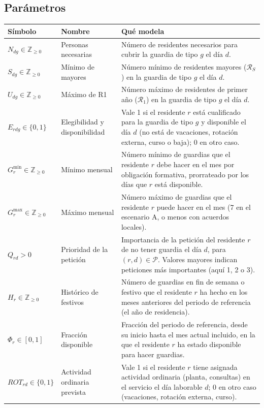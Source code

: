 \subsection{Parámetros}

{\small
\begin{longtable}{@{}p{2.6cm}p{3.0cm}p{10.0cm}@{}}
\toprule
Símbolo & Nombre & Qué modela \\
\midrule
\endhead
$N_{dg} \in \mathbb{Z}_{\ge 0}$ & Personas necesarias & Número de residentes necesarios para cubrir la guardia de tipo $g$ el día $d$. \\
$S_{dg} \in \mathbb{Z}_{\ge 0}$ & Mínimo de mayores & Número mínimo de residentes mayores ($\mathcal{R}_S$) en la guardia de tipo $g$ el día $d$. \\
$U_{dg} \in \mathbb{Z}_{\ge 0}$ & Máximo de R1 & Número máximo de residentes de primer año ($\mathcal{R}_1$) en la guardia de tipo $g$ el día $d$. \\
$E_{rdg} \in \{0, 1\}$ & Elegibilidad y disponibilidad & Vale 1 si el residente $r$ está cualificado para la guardia de tipo $g$ y disponible el día $d$ (no está de vacaciones, rotación externa, curso o baja); 0 en otro caso. \\
$G^{\min}_r \in \mathbb{Z}_{\ge 0}$ & Mínimo mensual & Número mínimo de guardias que el residente $r$ debe hacer en el mes por obligación formativa, prorrateado por los días que $r$ está disponible. \\
$G^{\max}_r \in \mathbb{Z}_{\ge 0}$ & Máximo mensual & Número máximo de guardias que el residente $r$ puede hacer en el mes (7 en el escenario A, o menos con acuerdos locales). \\
$Q_{rd} > 0$ & Prioridad de la petición & Importancia de la petición del residente $r$ de no tener guardia el día $d$, para $(r, d) \in \mathcal{P}$. Valores mayores indican peticiones más importantes (aquí 1, 2 o 3). \\
$H_r \in \mathbb{Z}_{\ge 0}$ & Histórico de festivos & Número de guardias en fin de semana o festivo que el residente $r$ ha hecho en los meses anteriores del periodo de referencia (el año de residencia). \\
$\Phi_r \in [0, 1]$ & Fracción disponible & Fracción del periodo de referencia, desde su inicio hasta el mes actual incluido, en la que el residente $r$ ha estado disponible para hacer guardias. \\
$ROT_{rd} \in \{0, 1\}$ & Actividad ordinaria prevista & Vale 1 si el residente $r$ tiene asignada actividad ordinaria (planta, consultas) en el servicio el día laborable $d$; 0 en otro caso (vacaciones, rotación externa, curso). \\

\end{longtable}}
